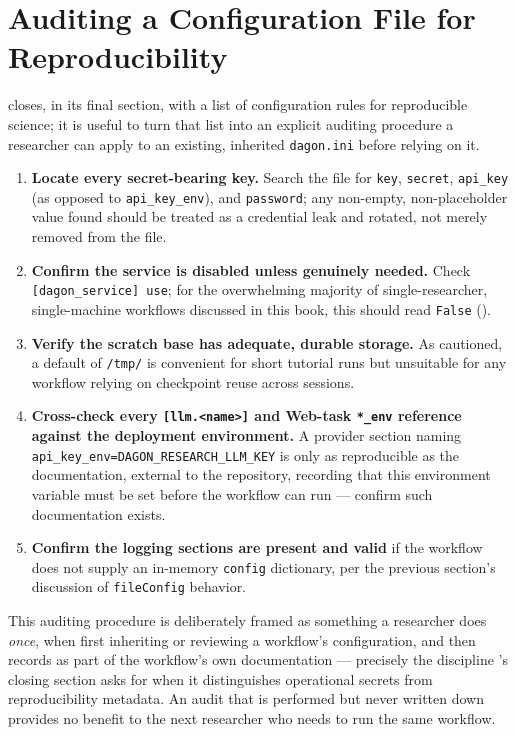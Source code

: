 \section{Auditing a Configuration File for Reproducibility}

 closes, in its final section, with a list of
configuration rules for reproducible science; it is useful to turn that list
into an explicit auditing procedure a researcher can apply to an existing,
inherited \texttt{dagon.ini} before relying on it.

\begin{enumerate}[leftmargin=1.8em]
  \item \textbf{Locate every secret-bearing key.} Search the file for
    \texttt{key}, \texttt{secret}, \texttt{api\_key} (as opposed to
    \texttt{api\_key\_env}), and \texttt{password}; any non-empty,
    non-placeholder value found should be treated as a credential leak and
    rotated, not merely removed from the file.
  \item \textbf{Confirm the service is disabled unless genuinely needed.}
    Check \texttt{[dagon\_service] use}; for the overwhelming majority of
    single-researcher, single-machine workflows discussed in this book,
    this should read \texttt{False} ().
  \item \textbf{Verify the scratch base has adequate, durable storage.} As
     cautioned, a default of \texttt{/tmp/} is
    convenient for short tutorial runs but unsuitable for any workflow
    relying on checkpoint reuse across sessions.
  \item \textbf{Cross-check every \texttt{[llm.<name>]} and Web-task
    \texttt{*\_env} reference against the deployment environment.} A
    provider section naming \texttt{api\_key\_env=DAGON\_RESEARCH\_LLM\_KEY}
    is only as reproducible as the documentation, external to the
    repository, recording that this environment variable must be set
    before the workflow can run --- confirm such documentation exists.
  \item \textbf{Confirm the logging sections are present and valid} if the
    workflow does not supply an in-memory \texttt{config} dictionary,
    per the previous section's discussion of \texttt{fileConfig} behavior.
\end{enumerate}

\begin{practicebox}
This auditing procedure is deliberately framed as something a researcher
does \emph{once}, when first inheriting or reviewing a workflow's
configuration, and then records as part of the workflow's own documentation
--- precisely the discipline 's closing section asks
for when it distinguishes operational secrets from reproducibility
metadata. An audit that is performed but never written down provides no
benefit to the next researcher who needs to run the same workflow.
\end{practicebox}

